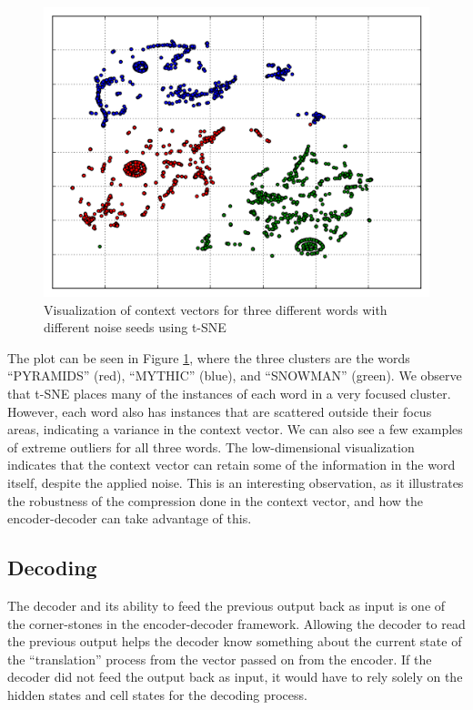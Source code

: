 \begin{figure}[!ht]
    \centering
    \includegraphics[width=.8\textwidth]{fig/results/context_exact.png}
    \captionsetup{justification=centering}
    \caption{Visualization of context vectors for three different words with different noise seeds using t-SNE}
    \label{fig:context_vector_plot}
\end{figure}

The plot can be seen in Figure \ref{fig:context_vector_plot}, where the three clusters are the words ``PYRAMIDS'' (red), ``MYTHIC'' (blue), and ``SNOWMAN'' (green). We observe that t-SNE places many of the instances of each word in a very focused cluster. However, each word also has instances that are scattered outside their focus areas, indicating a variance in the context vector. We can also see a few examples of extreme outliers for all three words. The low-dimensional visualization indicates that the context vector can retain some of the information in the word itself, despite the applied noise. This is an interesting observation, as it illustrates the robustness of the compression done in the context vector, and how the encoder-decoder can take advantage of this.

\subsection{Decoding}
The decoder and its ability to feed the previous output back as input is one of the corner-stones in the encoder-decoder framework. Allowing the decoder to read the previous output helps the decoder know something about the current state of the ``translation'' process from the vector passed on from the encoder. If the decoder did not feed the output back as input, it would have to rely solely on the hidden states and cell states for the decoding process.

